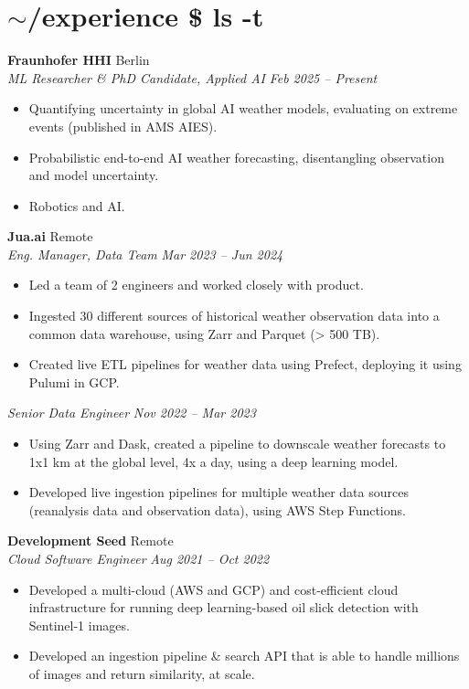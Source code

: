 \documentclass[a4paper,9pt]{article}
\newcommand{\entry}[4]{
  \noindent\textbf{#1} \hfill #2 \\
  \textsl{#3} \hfill \textsl{#4}
}
\begin{document}
\section*{\textcolor{promptcolor}{$\sim$/experience} \textcolor{commandcolor}{\$ ls -t}}

\entry{Fraunhofer HHI}{Berlin}{ML Researcher \& PhD Candidate, Applied AI}{Feb 2025 -- Present}
\begin{itemize}[leftmargin=15pt, nosep]
    \item Quantifying uncertainty in global AI weather models, evaluating on extreme events (published in AMS AIES).
    \item Probabilistic end-to-end AI weather forecasting, disentangling observation and model uncertainty.
    \item Robotics and AI.
\end{itemize}
\vspace{2pt}

\entry{Jua.ai}{Remote}{Eng. Manager, Data Team}{Mar 2023 -- Jun 2024}
\begin{itemize}[leftmargin=15pt, nosep]
    \item Led a team of 2 engineers and worked closely with product.
    \item Ingested 30 different sources of historical weather observation data into a common data warehouse, using Zarr and Parquet (> 500 TB).
    \item Created live ETL pipelines for weather data using Prefect, deploying it using Pulumi in GCP.
\end{itemize}
\textsl{Senior Data Engineer} \hfill \textsl{Nov 2022 -- Mar 2023}
\begin{itemize}[leftmargin=15pt, nosep]
    \item Using Zarr and Dask, created a pipeline to downscale weather forecasts to 1x1 km at the global level, 4x a day, using a deep learning model.
    \item Developed live ingestion pipelines for multiple weather data sources (reanalysis data and observation data), using AWS Step Functions.
\end{itemize}
\vspace{2pt}

\entry{Development Seed}{Remote}{Cloud Software Engineer}{Aug 2021 -- Oct 2022}
\begin{itemize}[leftmargin=15pt, nosep]
    \item Developed a multi-cloud (AWS and GCP) and cost-efficient cloud infrastructure for running deep learning-based oil slick detection with Sentinel-1 images.
    \item Developed an ingestion pipeline \& search API that is able to handle millions of images and return similarity, at scale.
\end{itemize}
\vspace{2pt}
\end{document}
